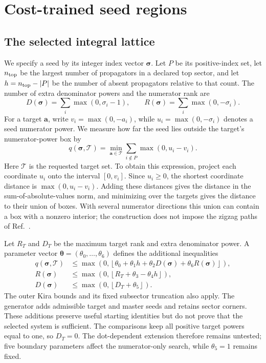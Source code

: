\section{Cost-trained seed regions}
\label{app:seed-geometry}
\subsection{The selected integral lattice}
We specify a seed by its integer index vector $\boldsymbol\sigma$. Let $P$ be its positive-index set, let $n_{\rm top}$ be the largest number of propagators in a declared top sector, and let $h=n_{\rm top}-|P|$ be the number of absent propagators relative to that count. The number of extra denominator powers and the numerator rank are
\begin{equation}
 D(\boldsymbol\sigma)=\sum_i\max(0,\sigma_i-1),\qquad
 R(\boldsymbol\sigma)=\sum_i\max(0,-\sigma_i).
 \label{eq:geometry-degrees}
\end{equation}
For a target $\boldsymbol a$, write $v_i=\max(0,-a_i)$, while $u_i=\max(0,-\sigma_i)$ denotes a seed numerator power. We measure how far the seed lies outside the target's numerator-power box by
\begin{equation}
 q(\boldsymbol\sigma,\mathcal T)
 =\min_{\boldsymbol a\in\mathcal T}\sum_{i\notin P}\max(0,u_i-v_i).
 \label{eq:geometry-distance}
\end{equation}
Here $\mathcal T$ is the requested target set. To obtain this expression, project each coordinate $u_i$ onto the interval $[0,v_i]$. Since $u_i\geq0$, the shortest coordinate distance is $\max(0,u_i-v_i)$. Adding these distances gives the distance in the sum-of-absolute-values norm, and minimizing over the targets gives the distance to their union of boxes. With several numerator directions this union can contain a box with a nonzero interior; the construction does not impose the zigzag paths of Ref.~\cite{TubeSeeding2026}.

Let $R_T$ and $D_T$ be the maximum target rank and extra denominator power. A parameter vector $\boldsymbol\theta=(\theta_0,\ldots,\theta_6)$ defines the additional inequalities
\begin{align}
 q(\boldsymbol\sigma,\mathcal T)&\leq
 \max\!\left(0,\left\lfloor\theta_0+\theta_1h+
                  \theta_2D(\boldsymbol\sigma)+\theta_6R(\boldsymbol\sigma)\right\rfloor\right),\\
 R(\boldsymbol\sigma)&\leq
 \max\!\left(0,\left\lfloor R_T+\theta_3-\theta_4h\right\rfloor\right),\\
 D(\boldsymbol\sigma)&\leq\max\!\left(0,\left\lfloor D_T+\theta_5\right\rfloor\right).
 \label{eq:geometry-boundaries}
\end{align}
The outer Kira bounds and its fixed subsector truncation also apply. The generator adds admissible target and master seeds and retains sector corners. These additions preserve useful starting identities but do not prove that the selected system is sufficient. The comparisons keep all positive target powers equal to one, so $D_T=0$. The dot-dependent extension therefore remains untested; five boundary parameters affect the numerator-only search, while $\theta_5=1$ remains fixed.


